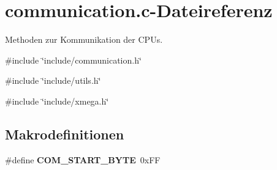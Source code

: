 \section{communication.c-\/Dateireferenz}
\label{communication_8c}


Methoden zur Kommunikation der CPUs.  


{\ttfamily \#include \char`\"{}include/communication.h\char`\"{}}\par
{\ttfamily \#include \char`\"{}include/utils.h\char`\"{}}\par
{\ttfamily \#include \char`\"{}include/xmega.h\char`\"{}}\par
\subsection*{Makrodefinitionen}
\begin{DoxyCompactItemize}
\item 
\#define {\bf COM\_\-START\_\-BYTE}~0xFF
\end{DoxyCompactItemize}
